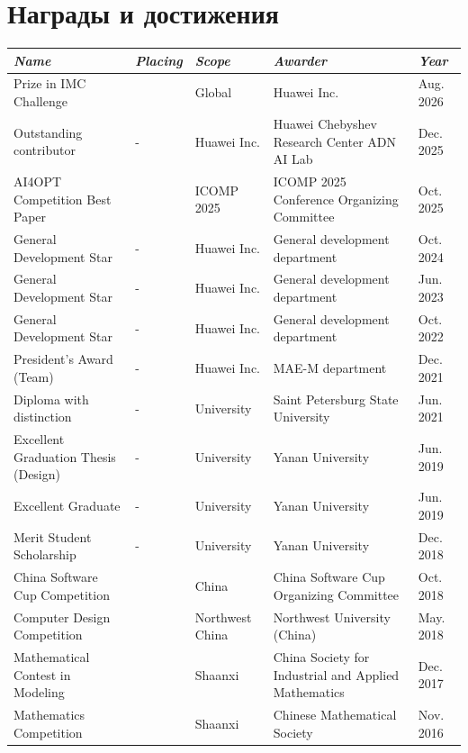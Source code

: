\documentclass[letterpaper,10pt]{article}
\makeatletter
\newcommand{\awardsTable}[1]{
	\begin{tabularx}{\textwidth}{l @{\extracolsep{\fill}} *{4}{l}}
	\emph{Name}	& \emph{Placing}	& \emph{Scope}	& \emph{Awarder} & \emph{Year}       \\
	\midrule\midrule
	#1
	\end{tabularx}
}
\newcommand{\awardsTableRow}[6]{
	\BeginAccSupp{method=plain, ActualText=11\string\t 21}#1 & #2 & #3 & #4 & #5\EndAccSupp{} \\
}
\makeatother
\begin{document}
\section{Награды и достижения}
\setlength{\tabcolsep}{6.0pt}
\renewcommand{\arraystretch}{1.1}
\fontsize{8.5}{11}\selectfont
\awardsTable{
  \awardsTableRow{\nth{3} Prize in \nth{2} IMC Challenge}{\nth{3}}{Global}{Huawei Inc.}{Aug. 2026} \\
  \awardsTableRow{Outstanding contributor}{-}{Huawei Inc.}{Huawei Chebyshev
                  Research Center ADN AI Lab}{Dec. 2025} \\
  \awardsTableRow{AI4OPT Competition Best Paper}{\nth{1}}{ICOMP 2025}{ICOMP
                  2025 Conference Organizing Committee}{Oct. 2025} \\
  \awardsTableRow{General Development Star}{-}{Huawei Inc.}{General development
                  department}{Oct. 2024} \\
  \awardsTableRow{General Development Star}{-}{Huawei Inc.}{General development
                  department}{Jun. 2023} \\
  \awardsTableRow{General Development Star}{-}{Huawei Inc.}{General development
                  department}{Oct. 2022} \\
  \awardsTableRow{President's Award (Team)}{-}{Huawei Inc.}{MAE-M
                  department}{Dec. 2021} \\
  \awardsTableRow{Diploma with distinction}{-}{University}{Saint Petersburg
                  State University}{Jun. 2021} \\
  \awardsTableRow{Excellent Graduation Thesis (Design)}{-}{University}{Yanan
                  University}{Jun. 2019} \\
  \awardsTableRow{Excellent Graduate}{-}{University}{Yanan University}{Jun.
                  2019} \\
  \awardsTableRow{Merit Student Scholarship}{-}{University}{Yanan
                  University}{Dec. 2018} \\
  \awardsTableRow{China Software Cup Competition}{\nth{3}}{China}{China
                  Software Cup Organizing Committee}{Oct. 2018} \\
  \awardsTableRow{Computer Design Competition}{\nth{3}}{Northwest
                  China}{Northwest University (China)}{May. 2018} \\
  \awardsTableRow{Mathematical Contest in Modeling}{\nth{2}}{Shaanxi}{China
                  Society for Industrial and Applied Mathematics}{Dec. 2017} \\
  \awardsTableRow{Mathematics Competition}{\nth{3}}{Shaanxi}{Chinese
                  Mathematical Society}{Nov. 2016} \\ \hline }
\end{document}
